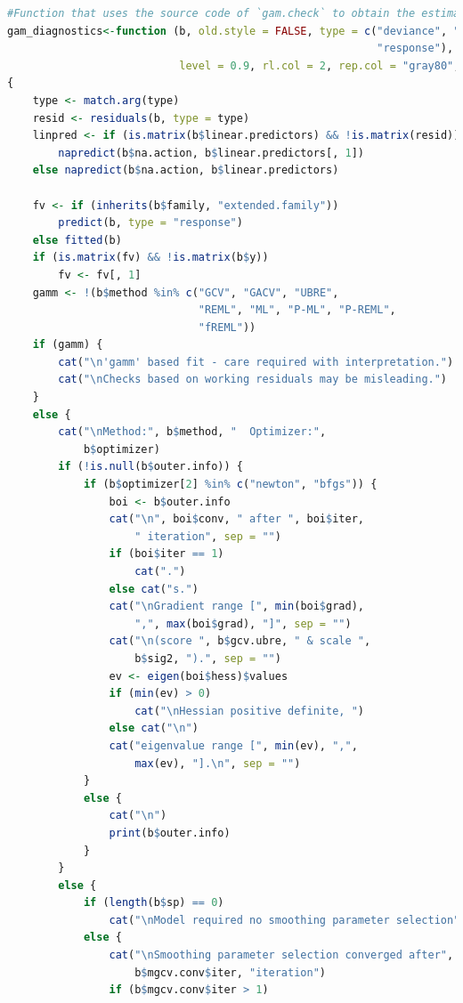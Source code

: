 \documentclass[
]{article}
\begin{document}
\begin{lstlisting}[language=R]
#Function that uses the source code of `gam.check` to obtain the estimates without the plots. The source can be checked by typing `gam.check` in the console.
gam_diagnostics<-function (b, old.style = FALSE, type = c("deviance", "pearson",
                                                          "response"), k.sample = 5000, k.rep = 200, rep = 0,
                           level = 0.9, rl.col = 2, rep.col = "gray80", ...)
{
    type <- match.arg(type)
    resid <- residuals(b, type = type)
    linpred <- if (is.matrix(b$linear.predictors) && !is.matrix(resid))
        napredict(b$na.action, b$linear.predictors[, 1])
    else napredict(b$na.action, b$linear.predictors)

    fv <- if (inherits(b$family, "extended.family"))
        predict(b, type = "response")
    else fitted(b)
    if (is.matrix(fv) && !is.matrix(b$y))
        fv <- fv[, 1]
    gamm <- !(b$method %in% c("GCV", "GACV", "UBRE",
                              "REML", "ML", "P-ML", "P-REML",
                              "fREML"))
    if (gamm) {
        cat("\n'gamm' based fit - care required with interpretation.")
        cat("\nChecks based on working residuals may be misleading.")
    }
    else {
        cat("\nMethod:", b$method, "  Optimizer:",
            b$optimizer)
        if (!is.null(b$outer.info)) {
            if (b$optimizer[2] %in% c("newton", "bfgs")) {
                boi <- b$outer.info
                cat("\n", boi$conv, " after ", boi$iter,
                    " iteration", sep = "")
                if (boi$iter == 1)
                    cat(".")
                else cat("s.")
                cat("\nGradient range [", min(boi$grad),
                    ",", max(boi$grad), "]", sep = "")
                cat("\n(score ", b$gcv.ubre, " & scale ",
                    b$sig2, ").", sep = "")
                ev <- eigen(boi$hess)$values
                if (min(ev) > 0)
                    cat("\nHessian positive definite, ")
                else cat("\n")
                cat("eigenvalue range [", min(ev), ",",
                    max(ev), "].\n", sep = "")
            }
            else {
                cat("\n")
                print(b$outer.info)
            }
        }
        else {
            if (length(b$sp) == 0)
                cat("\nModel required no smoothing parameter selection")
            else {
                cat("\nSmoothing parameter selection converged after",
                    b$mgcv.conv$iter, "iteration")
                if (b$mgcv.conv$iter > 1)

\end{lstlisting}
\end{document}
